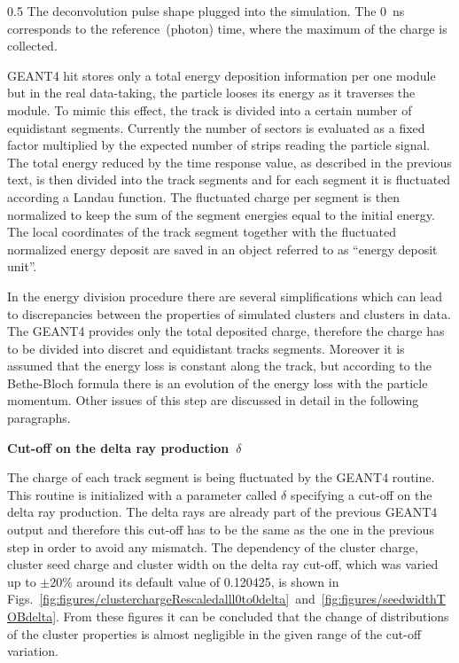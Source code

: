                  {0.5}       %
                 { The deconvolution pulse shape plugged into the simulation. The 0~ns corresponds to the reference~(photon) time, where the maximum of the charge is collected.}

GEANT4 hit stores only a total energy deposition information per one module but in the real data-taking, the particle looses its energy as it traverses the module. To mimic this effect, the track is divided into a certain number of equidistant segments. Currently the number of sectors is evaluated as a fixed factor multiplied by the expected number of strips reading the particle signal. The total energy reduced by the time response value, as described in the previous text, is then divided into the track segments and for each segment it is fluctuated according a Landau function. The fluctuated charge per segment is then normalized to keep the sum of the segment energies equal to the initial energy. The local coordinates of the track segment together with the fluctuated normalized energy deposit are saved in an object referred to as ``energy deposit unit''.

In the energy division procedure there are several simplifications which can lead to discrepancies between the properties of simulated clusters and clusters in data. The GEANT4 provides only the total deposited charge, therefore the charge has to be divided into discret and equidistant tracks segments. Moreover it is assumed that the energy loss is constant along the track, but according to the Bethe-Bloch formula there is an evolution of the energy loss with the particle momentum. Other issues of this step are discussed in detail in the following paragraphs.

\textbf{Cut-off on the delta ray production~$\delta$ }

The charge of each track segment is being fluctuated by the GEANT4 routine. This routine is initialized with a parameter called $\delta$ specifying a cut-off on the delta ray production. The delta rays are already part of the previous GEANT4 output and therefore this cut-off has to be the same as the one in the previous step in order to avoid any mismatch. The dependency of the cluster charge, cluster seed charge and cluster width on the delta ray cut-off, which was varied up to $\pm 20\%$ around its default value of 0.120425, is shown in Figs.~\ref{fig:figures/clusterchargeRescaledalll0to0delta}~and~\ref{fig:figures/seedwidthTOBdelta}. From these figures it can be concluded that the change of distributions of the cluster properties is almost negligible in the given range of the cut-off variation. 

